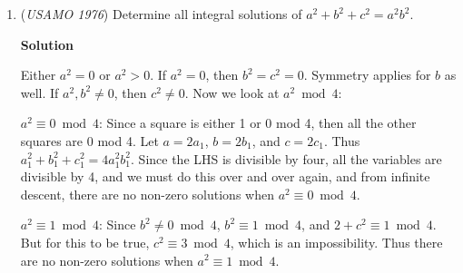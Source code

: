 \begin{enumerate}
\textbf{Solution 2}

Notice that $m\angle AYP=\frac{1}{2}m\overarc{AB}$ (Inscried angle theorem) and that $m\angle XAY=90$ since $XY$ is a diameter, and thus subtends an arc of $180$. This will hold for all $X$ and all $Y$, and so by AA similarity, the angle $APY$ will be constant for all P, thus implying that the points A, B, and all P will be concyclic.If we assume that the center of this circle is $H$, we know that $m\angle AHB=2m\angle APB=2(90-\frac{1}{2}\overarc{AB})=180-\overarc{AB}$. We can assume that $\overline{AH}$ and $\overline{BH}$ intersect the original circle at points $M$, and $N$ respectively. This will give us that $m\angle AHB=\frac{1}{2}|m\overarc{MN}-m\overarc{AB}|$ (Since $H$ lies on the perpendicular bisector of $AB$, we know that $M$, $N$ will be on the same side of $AB$.) Now we also know that $m\overarc{MN}\leq m\overarc{AB}$ or $m\overarc{MN}\leq 360-m\overarc{AB}$. The only case where $m\overarc{MN}$ satisfies the measure of $\angle AHB$, is when $M=A$ and $N=B$, implying that $AH$ and $BH$ are tangents, and so $H$ is the intersection of the tangents from $A$ and $B$ to the original circle. 

 


 <i>Alternate solutions are always welcome. If you have a different, elegant solution to this problem, please \href{https://artofproblemsolving.com/wiki/index.php?title=1976\_USAMO\_Problems/Problem\_2&action=edit}{add it} to this page.</i>



	\item (\textit{USAMO 1976}) Determine all integral solutions of $a^2+b^2+c^2=a^2b^2$.


 



\textbf{Solution}

Either $a^2=0$ or $a^2>0$. If $a^2=0$, then $b^2=c^2=0$. Symmetry applies for $b$ as well. If $a^2,b^2\neq 0$, then $c^2\neq 0$. Now we look at $a^2\bmod{4}$:

 $a^2\equiv 0\bmod{4}$: Since a square is either 1 or 0 mod 4, then all the other squares are 0 mod 4. Let $a=2a_1$, $b=2b_1$, and $c=2c_1$. Thus $a_1^2+b_1^2+c_1^2=4a_1^2b_1^2$. Since the LHS is divisible by four, all the variables are divisible by 4, and we must do this over and over again, and from infinite descent, there are no non-zero solutions when $a^2\equiv 0\bmod{4}$.

 $a^2\equiv 1\bmod{4}$: Since $b^2\neq 0\bmod{4}$, $b^2\equiv 1\bmod{4}$, and $2+c^2\equiv 1\bmod{4}$. But for this to be true, $c^2\equiv 3\bmod{4}$, which is an impossibility. Thus there are no non-zero solutions when $a^2\equiv 1\bmod{4}$.


\end{enumerate}
